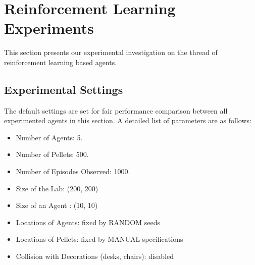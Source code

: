 \documentclass[conference]{IEEEtran}
\begin{document}
%
%
%

\section{Reinforcement Learning Experiments}
\label{section:rlexpo} 

This section presents our experimental investigation on the thread of reinforcement
learning based agents.

\subsection{Experimental Settings}
The default settings are set for fair performance comparison between all
experimented agents in this section. A detailed list of parameters are as follows:
\begin{itemize}
    \item Number of Agents: 5.
    \item Number of Pellets: 500. 
    \item Number of Episodes Observed: 1000. 
    \item Size of the Lab: (200, 200)
    \item Size of an Agent : (10, 10)
    \item Locations of Agents: fixed by RANDOM seeds
    \item Locations of Pellets: fixed by MANUAL specifications
    \item Collision with Decorations (desks, chairs): disabled
\end{itemize}
\end{document}
